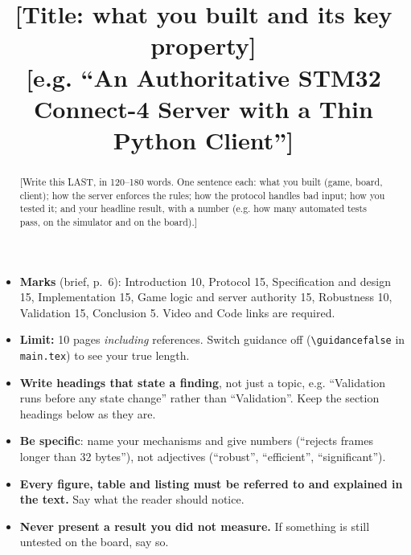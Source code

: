 \documentclass[conference]{IEEEtran}
\newif\ifguidance
\newcommand{\ph}[1]{\textcolor{phred}{[#1]}}
\newenvironment{guidance}[1][Guidance]
  {\ifguidance\begin{guidebox}[#1]\else\setbox0\vbox\bgroup\fi}
  {\ifguidance\end{guidebox}\else\egroup\fi}
\begin{document}
\title{\ph{Title: what you built and its key property}\\[2pt]
\normalsize\ph{e.g. ``An Authoritative STM32 Connect-4 Server with a Thin Python Client''}}

\author{
\IEEEauthorblockN{\ph{Student A full name} (\ph{student number})\quad
                  \ph{Student B full name} (\ph{student number})}
}

\maketitle

\begin{abstract}
\ph{Write this LAST, in 120--180 words. One sentence each: what you built
(game, board, client); how the server enforces the rules; how the protocol
handles bad input; how you tested it; and your headline result, with a number
(e.g. how many automated tests pass, on the simulator and on the board).}
\end{abstract}

\begin{guidance}[Before you start writing]
\begin{itemize}\setlength\itemsep{0pt}
\item \textbf{Marks} (brief, p.~6): Introduction 10, Protocol 15, Specification
  and design 15, Implementation 15, Game logic and server authority 15,
  Robustness 10, Validation 15, Conclusion 5. Video and Code links are required.
\item \textbf{Limit:} 10 pages \emph{including} references. Switch guidance off
  (\texttt{\textbackslash guidancefalse} in \texttt{main.tex}) to see your true length.
\item \textbf{Write headings that state a finding}, not just a topic, e.g.
  ``Validation runs before any state change'' rather than ``Validation''.
  Keep the section headings below as they are.
\item \textbf{Be specific}: name your mechanisms and give numbers
  (``rejects frames longer than 32 bytes''), not adjectives (``robust'',
  ``efficient'', ``significant'').
\item \textbf{Every figure, table and listing must be referred to and explained
  in the text.} Say what the reader should notice.
\item \textbf{Never present a result you did not measure.} If something is still
  untested on the board, say so.
\end{itemize}
\end{guidance}













\end{document}
